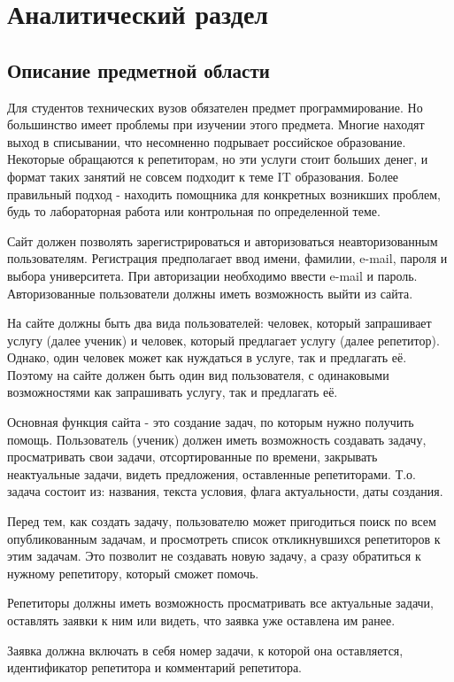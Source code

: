\chapter{Аналитический раздел}
\section{Описание предметной области}

Для студентов технических вузов обязателен предмет программирование. Но большинство имеет проблемы при изучении этого предмета. Многие находят выход в списывании, что несомненно подрывает российское образование. Некоторые обращаются к репетиторам, но эти услуги стоит больших денег, и формат таких занятий не совсем подходит к теме IT образования. Более правильный подход - находить помощника для конкретных возникших проблем, будь то лабораторная работа или контрольная по определенной теме.

Сайт должен позволять зарегистрироваться и авторизоваться неавторизованным пользователям. Регистрация предполагает ввод имени, фамилии, e-mail, пароля и выбора университета. При авторизации необходимо ввести e-mail и пароль.
Авторизованные пользователи должны иметь возможность выйти из сайта.

На сайте должны быть два вида пользователей: человек, который запрашивает услугу (далее ученик) и человек, который предлагает услугу (далее репетитор). Однако, один человек может как нуждаться в услуге, так и предлагать её. Поэтому на сайте должен быть один вид пользователя, с одинаковыми возможностями как запрашивать услугу, так и предлагать её.

Основная функция сайта - это создание задач, по которым нужно получить помощь. Пользователь (ученик) должен иметь возможность создавать задачу, просматривать свои задачи, отсортированные по времени, закрывать неактуальные задачи, видеть предложения, оставленные репетиторами. Т.о. задача состоит из: названия, текста условия, флага актуальности, даты создания.

Перед тем, как создать задачу, пользователю может пригодиться поиск по всем опубликованным задачам, и просмотреть список откликнувшихся репетиторов к этим задачам.  Это позволит не создавать новую задачу, а сразу обратиться к нужному репетитору, который сможет помочь.

Репетиторы должны иметь возможность просматривать все актуальные задачи, оставлять заявки к ним или видеть, что заявка уже оставлена им ранее.

Заявка должна включать в себя номер задачи, к которой она оставляется, идентификатор репетитора и комментарий репетитора.

